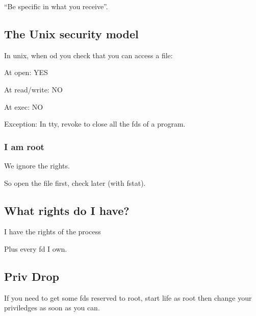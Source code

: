 \documentclass[a4paper,11pt]{article}
\begin{document}
``Be specific in what you receive''.

\subsection{The Unix security model}

In unix, when od you check that you can access a file:

At open: YES

At read/write: NO

At exec: NO

Exception: In tty, revoke to close all the fds of a program.

\subsubsection{I am root}

We ignore the rights.

So open the file first, check later (with fstat).

\subsection{What rights do I have?}

I have the rights of the process

Plus every fd I own.

\subsection{Priv Drop}

If you need to get some fds reserved to root, start life as root then
change your priviledges as soon as you can.
\end{document}
